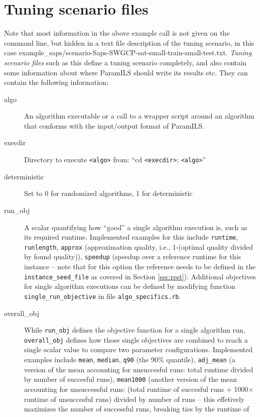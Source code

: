 \documentclass[10pt,letterpaper,twoside]{article}
\begin{document}
\section{Tuning scenario files}
Note that most information in the above example call is not given on the command line, but hidden in
a text file description of the tuning scenario, in this case example\_saps/scenario-Saps-SWGCP-sat-small-train-small-test.txt.
\emph{Tuning scenario files} such as this define a tuning scenario completely, and also contain
some information about where ParamILS should write its results etc.
They can contain the following information:

\begin{description}
	\item[algo] An algorithm executable or a call to a wrapper script around an algorithm that conforms with the input/output format of ParamILS.
	\item[execdir] Directory to execute \texttt{<algo>} from: ``cd \texttt{<execdir>}; \texttt{<algo>}'' 
	\item[deterministic] Set to 0 for randomized algorithms, 1 for deterministic 
	\item[run\_obj] A scalar quantifying how ``good'' a single algorithm execution is, such as its required runtime. Implemented examples for this
	include \texttt{runtime}, \texttt{runlength}, \texttt{approx} (approximation quality, i.e., 1-(optimal quality divided by found quality)), \texttt{speedup} (speedup over a reference runtime for this instance -- note that for this option the reference needs to be defined in the \texttt{instance\_seed\_file} as covered in Section \ref{sec:rest}). Additional objectives for single algorithm executions can be defined by modifying function \texttt{single\_run\_objective} in file \texttt{algo\_specifics.rb}.
	\item[overall\_obj] While \texttt{run\_obj} defines the objective function for a single algorithm run, \texttt{overall\_obj} defines how those single objectives are combined to reach a single scalar value to compare two parameter configurations. Implemented examples include
	\texttt{mean}, \texttt{median}, \texttt{q90} (the 90\% quantile), \texttt{adj\_mean} (a version of the mean accounting for unsuccesful runs: total runtime divided by number of succesful runs), \texttt{mean1000} (another version of the mean accounting for unsuccessful runs: (total runtime of succesful runs + 1000$\times$ runtime of unsuccesful runs) divided by number of runs -- this effetively maximizes the number of successful runs, breaking ties by the runtime of

\end{description}
\end{document}
